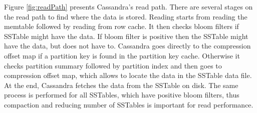 Figure \ref{fig:readPath} presents Cassandra's read path. There are several stages on the read path to find where the data is stored. Reading starts from reading the memtable followed by reading from row cache. It then checks bloom filters if SSTable might have the data. If bloom filter is positive then the SSTable might have the data, but does not have to. Cassandra goes directly to the compression offset map if a partition key is found in the partition key cache. Otherwise it checks partition summary followed by partition index and then goes to compression offset map, which allows to locate the data in the SSTable data file. At the end, Cassandra fetches the data from the SSTable on disk. The same process is performed for all SSTables, which have positive bloom filters, thus compaction and reducing number of SSTables is important for read performance.


